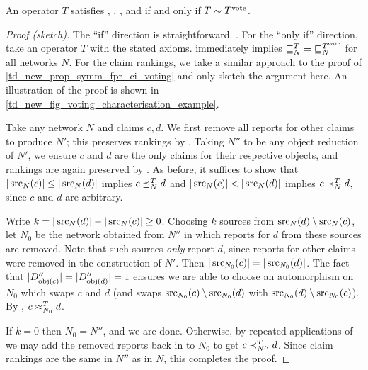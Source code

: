 \begin{theorem}
    \label{td_new_thm_voting_characterisation}
    An operator $T$ satisfies \symmetry{}, \freshposresp{},
    \classicalindependence{}, \flatsources{} and \objectirrelevance{} if and
    only if $T \sim T^{\operatorname{vote}}$.
\end{theorem}

\begin{proof}[Proof (sketch)]
    The ``if'' direction is straightforward. . For the
    ``only if'' direction, take an operator $T$ with the stated axioms.
    \flatsources{} immediately implies ${\sqsubseteq_N^T} = {\sqsubseteq_N^{T^{\operatorname{vote}}}}$ for
    all networks $N$. For the claim rankings, we take a similar approach to the
    proof of \cref{td_new_prop_symm_fpr_ci_voting} and only sketch the argument
    here. An illustration of the proof is shown in
    \cref{td_new_fig_voting_characterisation_example}.

    Take any network $N$ and claims $c, d$. We first remove all reports for
    other claims to produce $N'$; this preserves rankings by
    \classicalindependence{}. Taking $N''$ to be any object reduction of $N'$,
    we ensure $c$ and $d$ are the only claims for their respective
    objects,\footnotemark{} and rankings are again preserved by
    \objectirrelevance{}. As before, it suffices to show that $|\operatorname{src}_N(c)| \le
    |\operatorname{src}_N(d)|$ implies $c \preceq_N^T d$ and $|\operatorname{src}_N(c)| < |\operatorname{src}_N(d)|$ implies
    $c \prec_N^T d$, since $c$ and $d$ are arbitrary.

    Write $k = |\operatorname{src}_N(d)| - |\operatorname{src}_N(c)| \ge 0$. Choosing $k$ sources from
    $\operatorname{src}_N(d) \setminus \operatorname{src}_N(c)$, let $N_0$ be the network obtained from
    $N''$ in which reports for $d$ from these sources are removed. Note that
    such sources \emph{only} report $d$, since reports for other claims were
    removed in the construction of $N'$. Then $|\operatorname{src}_{N_0}(c)| =
    |\operatorname{src}_{N_0}(d)|$. The fact that $|D''_{\operatorname{obj}(c)}| = |D''_{\operatorname{obj}(d)}| = 1$
    ensures we are able to choose an automorphism on $N_0$ which swaps $c$ and
    $d$ (and swaps $\operatorname{src}_{N_0}(c) \setminus \operatorname{src}_{N_0}(d)$ with $\operatorname{src}_{N_0}(d)
    \setminus \operatorname{src}_{N_0}(c)$). By \symmetry{}, $c \approx_{N_0}^T d$.

    If $k = 0$ then $N_0 = N''$, and we are done. Otherwise, by repeated
    applications of \freshposresp{} we may add the removed reports back in to
    $N_0$ to get $c \prec_{N''}^T d$. Since claim rankings are the same in $N''$
    as in $N$, this completes the proof.
\end{proof}

